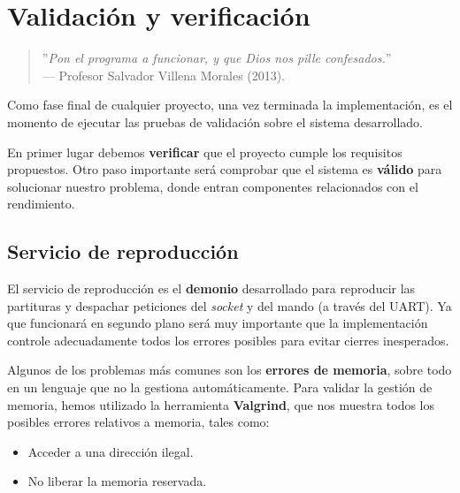 \chapter{Validación y verificación}
\label{cap:capitulo6}

\smallskip

\begin{quote}
	\begin{flushright}
		\small ''\textit{Pon el programa a funcionar, y que Dios nos pille confesados.}'' \\
		--- Profesor Salvador Villena Morales (2013).
	\end{flushright}
\end{quote}

\smallskip

Como fase final de cualquier proyecto, una vez terminada la implementación, es el momento de ejecutar las pruebas de validación sobre el sistema desarrollado.

En primer lugar debemos \textbf{verificar} que el proyecto cumple los requisitos propuestos. Otro paso importante será comprobar que el sistema es \textbf{válido} para solucionar nuestro problema, donde entran componentes relacionados con el rendimiento.

\newpage

\section{Servicio de reproducción}

El servicio de reproducción es el \textbf{demonio} desarrollado para reproducir las partituras y despachar peticiones del \textit{socket} y del mando (a través del \acrshort{UART}). Ya que funcionará en segundo plano será muy importante que la implementación controle adecuadamente todos los errores posibles para evitar cierres inesperados.

Algunos de los problemas más comunes son los \textbf{errores de memoria}, sobre todo en un lenguaje que no la gestiona automáticamente. Para validar la gestión de memoria, hemos utilizado la herramienta \textbf{Valgrind}, que nos muestra todos los posibles errores relativos a memoria, tales como:

\begin{itemize}
	\item Acceder a una dirección ilegal.
	\item No liberar la memoria reservada.
\end{itemize}

